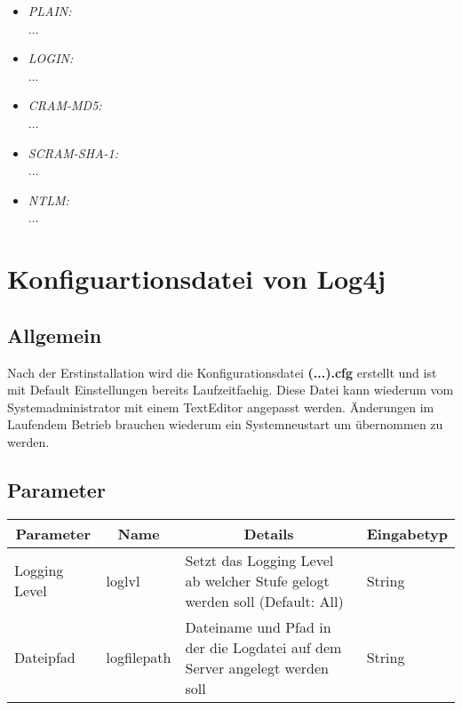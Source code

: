 \begin{itemize}
	\item \emph{PLAIN:}\\
	...
	\item \emph{LOGIN:}\\
	...
	\item \emph{CRAM-MD5:}\\
	...
	\item \emph{SCRAM-SHA-1:}\\
	...
	\item \emph{NTLM:}\\
	...
\end{itemize}

\section{Konfiguartionsdatei von Log4j}	

\subsection{Allgemein}

Nach der Erstinstallation wird die Konfigurationsdatei \textbf{(...).cfg} erstellt und ist mit Default Einstellungen bereits Laufzeitfaehig. Diese Datei kann wiederum vom Systemadministrator mit einem TextEditor angepasst werden. Änderungen im Laufendem Betrieb brauchen wiederum ein Systemneustart um übernommen zu werden.

\subsection{Parameter}

\begin{center}
	\begin{longtable}{|p{4cm} | p{3cm}| p{7cm} | p{2cm} |}
	\hline
	\multicolumn{1}{|c|}{\textbf{Parameter}} & \multicolumn{1}{c|}{\textbf{Name}} & \multicolumn{1}{c|}{\textbf{Details}} & \multicolumn{1}{c|}{\textbf{Eingabetyp}}
	\\ \hline
	Logging Level & loglvl & Setzt das Logging Level ab welcher Stufe gelogt werden soll (Default: All) & String \\ \hline
	Dateipfad & logfilepath & Dateiname und Pfad in der die Logdatei auf dem Server angelegt werden soll & String \\ \hline
	
\end{longtable}

\end{center}

